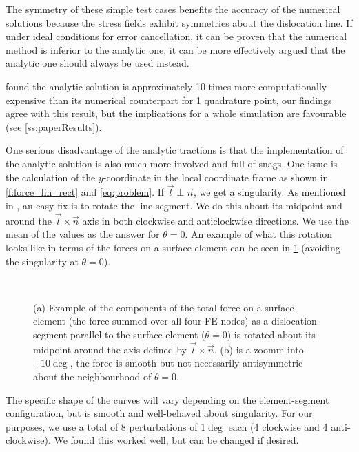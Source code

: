 The symmetry of these simple test cases benefits the accuracy of the numerical solutions because the stress fields exhibit symmetries about the dislocation line. If under ideal conditions for error cancellation, it can be proven that the numerical method is inferior to the analytic one, it can be more effectively argued that the analytic one should always be used instead.

\citet{analytic_tractions} found the analytic solution is approximately 10 times more computationally expensive than its numerical counterpart for 1 quadrature point, our findings agree with this result, but the implications for a whole simulation are favourable (see \cref{ss:paperResults}).

One serious disadvantage of the analytic tractions is that the implementation of the analytic solution is also much more involved and full of snags. One issue is the calculation of the $y$-coordinate in the local coordinate frame as shown in \cref{f:force_lin_rect} and \cref{eq:problem}. If $\vec{l} \perp \vec{n}$, we get a singularity. As mentioned in \cite{analytic_tractions}, an easy fix is to rotate the line segment. We do this about its midpoint and around the $\vec{l} \times \vec{n}$ axis in both clockwise and anticlockwise directions. We use the mean of the values as the answer for $\theta = 0$. An example of what this rotation looks like in terms of the forces on a surface element can be seen in \cref{f:rotate} (avoiding the singularity at $\theta = 0$).
\begin{figure}
  \centering
  ~
  \caption[Sample analytical forces on an element as a function of angle between surface and segment.]{(a) Example of the components of the total force on a surface element (the force summed over all four FE nodes) as a dislocation segment parallel to the surface element ($\theta = 0$) is rotated about its midpoint around the axis defined by $\vec{l}\times\vec{n}$. (b) is a zoomm into $\pm 10 \deg$, the force is smooth but not necessarily antisymmetric about the neighbourhood of $\theta=0$.}
  \label{f:rotate}
\end{figure}
The specific shape of the curves will vary depending on the element-segment configuration, but is smooth and well-behaved about singularity. For our purposes, we use a total of 8 perturbations of $1\deg$ each (4 clockwise and 4 anti-clockwise). We found this worked well, but can be changed if desired.

